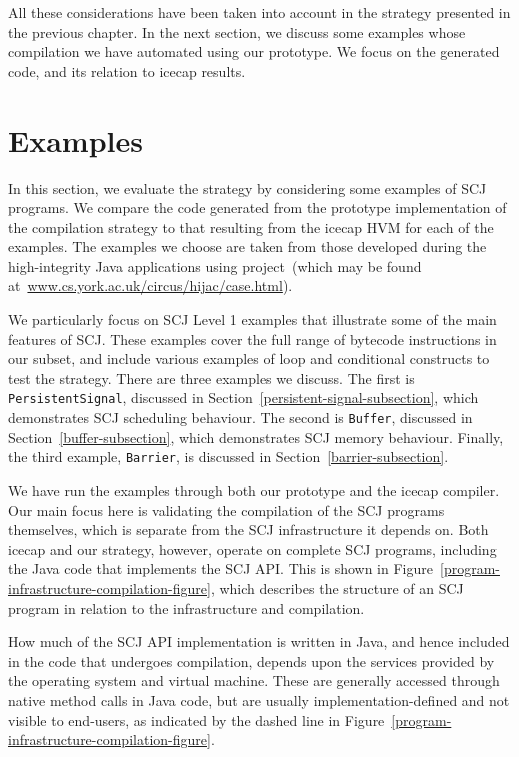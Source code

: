 All these considerations have been taken into account in the strategy
presented in the previous chapter.
In the next section, we discuss some examples whose compilation we
have automated using our prototype. 
We focus on the generated code, and its relation to icecap results.


\section{Examples}
\label{examples-section}

In this section, we evaluate the strategy by considering some examples
of SCJ programs.
We compare the code generated from the prototype implementation of the
compilation strategy to that resulting from the icecap HVM for each of
the examples.
The examples we choose are taken from those developed during the
high-integrity Java applications using \Circus{} project~(which may be
found at~\url{www.cs.york.ac.uk/circus/hijac/case.html}).

We particularly focus on SCJ Level 1 examples that illustrate some of
the main features of SCJ.
These examples cover the full range of bytecode instructions in our
subset, and include various examples of loop and conditional
constructs to test the strategy.
There are three examples we discuss.
The first is \texttt{PersistentSignal}, discussed in
Section~\ref{persistent-signal-subsection}, which demonstrates SCJ
scheduling behaviour.
The second is \texttt{Buffer}, discussed in
Section~\ref{buffer-subsection}, which demonstrates SCJ memory
behaviour.
Finally, the third example, \texttt{Barrier}, is discussed in
Section~\ref{barrier-subsection}.

We have run the examples through both our prototype and the icecap
compiler.
Our main focus here is validating the compilation of the SCJ programs
themselves, which is separate from the SCJ infrastructure it depends
on.
Both icecap and our strategy, however, operate on complete SCJ
programs, including the Java code that implements the SCJ API.
This is shown in
Figure~\ref{program-infrastructure-compilation-figure}, which
describes the structure of an SCJ program in relation to the
infrastructure and compilation.

How much of the SCJ API implementation is written in Java, and hence
included in the code that undergoes compilation, depends upon the
services provided by the operating system and virtual machine.
These are generally accessed through native method calls in Java code,
but are usually implementation-defined and not visible to end-users,
as indicated by the dashed line in
Figure~\ref{program-infrastructure-compilation-figure}.

